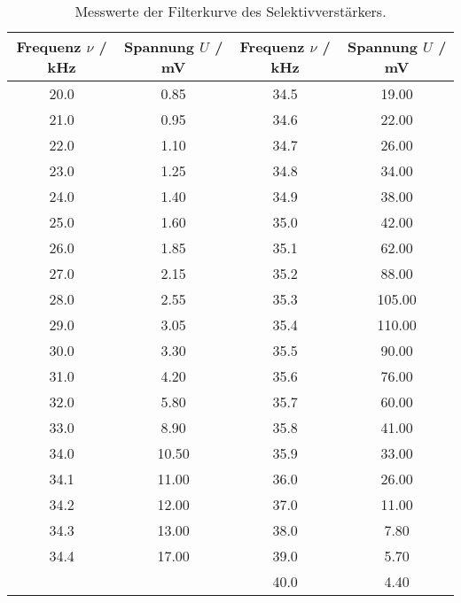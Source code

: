 \begin{table}[!htp]
\centering
\caption{Messwerte der Filterkurve des Selektivverstärkers.}
\label{tab:selektiv}
\begin{tabular}{c c c c}
\toprule
{Frequenz $\nu$ / kHz} & {Spannung $U$ / mV} & {Frequenz $\nu$ / kHz} & {Spannung $U$ / mV}\\
\midrule 
20.0 & 0.85  & 34.5 & 19.00 \\
21.0 & 0.95  & 34.6 & 22.00 \\
22.0 & 1.10  & 34.7 & 26.00 \\
23.0 & 1.25  & 34.8 & 34.00 \\
24.0 & 1.40  & 34.9 & 38.00 \\
25.0 & 1.60  & 35.0 & 42.00 \\
26.0 & 1.85  & 35.1 & 62.00 \\
27.0 & 2.15  & 35.2 & 88.00 \\
28.0 & 2.55  & 35.3 & 105.00\\
29.0 & 3.05  & 35.4 & 110.00\\
30.0 & 3.30  & 35.5 & 90.00 \\
31.0 & 4.20  & 35.6 & 76.00 \\
32.0 & 5.80  & 35.7 & 60.00 \\
33.0 & 8.90  & 35.8 & 41.00 \\
34.0 & 10.50 & 35.9 & 33.00 \\
34.1 & 11.00 & 36.0 & 26.00 \\
34.2 & 12.00 &37.0 & 11.00 \\
34.3 & 13.00 &38.0 & 7.80  \\
34.4 & 17.00 &39.0 & 5.70  \\
     &         &40.0 & 4.40  \\
\bottomrule
\end{tabular}
\end{table}